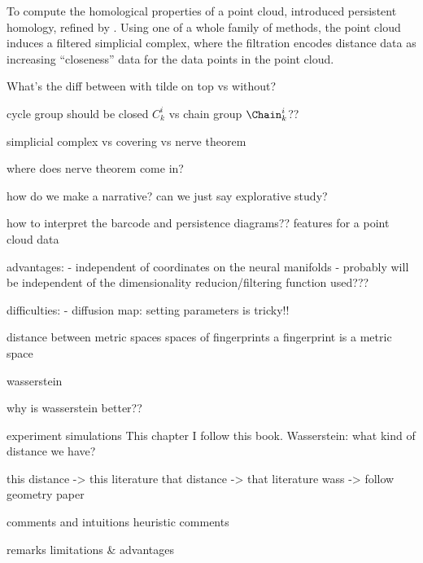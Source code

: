 To compute the homological properties of a point cloud,
\cite{ELZ_02} introduced persistent homology, refined by
\cite{Carlsson_04}. Using one of a whole family of methods, the point
cloud induces a filtered simplicial complex, where the filtration
encodes distance data as increasing ``closeness'' data for the data
points in the point cloud.


What's the diff between with tilde on top vs without?

cycle group should be closed $C_k^i$ vs chain group $\Chain_k^i$??

simplicial complex vs covering vs nerve theorem 

where does nerve theorem come in?

how do we make a narrative? can we just say explorative study?

how to interpret the barcode and persistence diagrams??
features for a point cloud data


advantages: 
- independent of coordinates on the neural manifolds
- probably will be independent of the dimensionality reducion/filtering function used???


difficulties:
- diffusion map: setting parameters is tricky!!


distance between metric spaces
spaces of fingerprints a fingerprint is a metric space 

wasserstein

why is wasserstein better??

experiment 
simulations
This chapter I follow this book. 
Wasserstein: what kind of distance we have?

this distance -> this literature 
that distance -> that literature
wass -> follow geometry paper

comments and intuitions heuristic comments

remarks
limitations & advantages